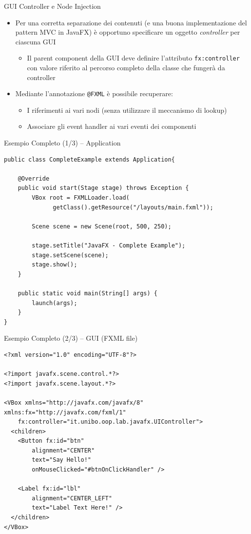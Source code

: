 \documentclass[presentation]{beamer}
\begin{document}
\begin{frame}{GUI Controller e Node Injection}
\begin{itemize}\itemsep20pt
\item Per una corretta separazione dei contenuti (e una buona implementazione del pattern MVC in JavaFX) è opportuno specificare un oggetto \emph{controller} per ciascuna GUI
\begin{itemize}
\item Il parent component della GUI deve definire l'attributo \texttt{fx:controller} con valore riferito al percorso completo della classe che fungerà da controller
\end{itemize}
\item Mediante l'annotazione \texttt{@FXML} è possibile recuperare:
\begin{itemize}
\item I riferimenti ai vari nodi (senza utilizzare il meccanismo di lookup)
\item Associare gli event handler ai vari eventi dei componenti
\end{itemize}
\end{itemize}
\end{frame}

\begin{frame}[fragile]{Esempio Completo (1/3) -- Application}
\begin{lstlisting}
public class CompleteExample extends Application{

	@Override
	public void start(Stage stage) throws Exception {
		VBox root = FXMLLoader.load(
		      getClass().getResource("/layouts/main.fxml"));
		
		Scene scene = new Scene(root, 500, 250);
		
		stage.setTitle("JavaFX - Complete Example");
		stage.setScene(scene);
		stage.show();
	}
	
	public static void main(String[] args) {
		launch(args);
	}
}
\end{lstlisting}
\end{frame}

\begin{frame}[fragile]{Esempio Completo (2/3) -- GUI (FXML file)}
\begin{lstlisting}
<?xml version="1.0" encoding="UTF-8"?>

<?import javafx.scene.control.*?>
<?import javafx.scene.layout.*?>

<VBox xmlns="http://javafx.com/javafx/8" xmlns:fx="http://javafx.com/fxml/1"
	fx:controller="it.unibo.oop.lab.javafx.UIController">
  <children>
    <Button fx:id="btn"
    	alignment="CENTER"
    	text="Say Hello!"
    	onMouseClicked="#btnOnClickHandler" />
    
    <Label fx:id="lbl"
    	alignment="CENTER_LEFT"
    	text="Label Text Here!" />
  </children>
</VBox>
\end{lstlisting}
\end{frame}
\end{document}

